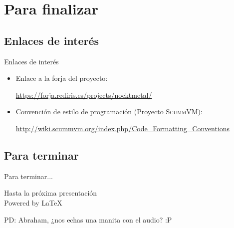 \documentclass[9pt,xcolor=svgnames]{beamer}
\begin{document}
  \section{Para finalizar}
  
  \subsection{Enlaces de interés}
  
  \begin{frame}{Enlaces de interés}
   \transdissolve
   
   \begin{itemize}
   \item Enlace a la forja del proyecto:
   
  \url{https://forja.rediris.es/projects/nocktmetal/}
  
  \item Convención de estilo de programación (Proyecto \textsc{ScummVM}):
  
  \url{http://wiki.scummvm.org/index.php/Code_Formatting_Conventions}
   \end{itemize}
  \end{frame}
  
  
  \subsection{Para terminar}
  
  
  \begin{frame}{Para terminar...}
   \transdissolve
   
   \begin{center}
   \Large Hasta la próxima presentación\\
   
   \Huge Powered by \LaTeX\\[3cm]
   \end{center}
   
   \normalsize
   
   PD: Abraham, ¿nos echas una manita con el audio? :P
   
  \end{frame}

  
  
  
\end{document}
